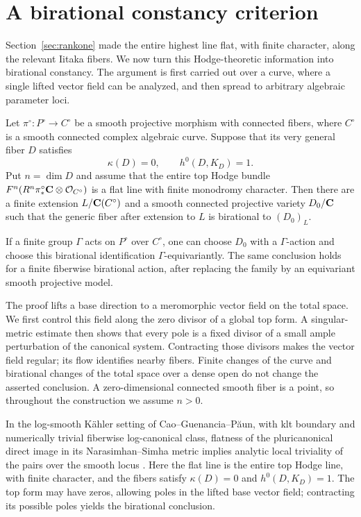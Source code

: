 \section{A birational constancy criterion}
\label{cc:section}

Section~\ref{sec:rankone} made the entire highest line flat, with
finite character, along the relevant Iitaka fibers. We now turn this
Hodge-theoretic information into birational constancy. The argument is
first carried out over a curve, where a single lifted vector field can
be analyzed, and then spread to arbitrary algebraic parameter loci.

\begin{theorem}
\label{cc:criterion}
Let $\pi^\circ:P^\circ\to C^\circ$ be a smooth projective morphism with
connected fibers, where $C^\circ$ is a smooth connected complex algebraic
curve.  Suppose that its very general fiber $D$ satisfies
\[
                 \kappa(D)=0,\qquad h^0(D,K_D)=1.
\]
Put $n=\dim D$ and assume that the entire top Hodge bundle
$F^n(R^n\pi^\circ_*\mathbf C\otimes\mathcal O_{C^\circ})$ is a flat line with
finite monodromy character.  Then there are a finite
extension $L/\mathbf C(C^\circ)$ and a smooth connected projective variety
$D_0/\mathbf C$ such that the generic fiber after extension to $L$ is birational
to $(D_0)_L$.

If a finite group $\Gamma$ acts on $P^\circ$ over $C^\circ$, one can choose
$D_0$ with a $\Gamma$-action and choose this birational identification
$\Gamma$-equivariantly.  The same conclusion holds for a finite
fiberwise birational action, after replacing the family by an
equivariant smooth projective model.
\end{theorem}

The proof lifts a base direction to a meromorphic vector field on the
total space.  We first control this field along the zero divisor of a
global top form.  A singular-metric estimate then shows that every pole
is a fixed divisor of a small ample perturbation of the canonical
system.  Contracting those divisors makes the vector field regular;
its flow identifies nearby fibers.  Finite changes of the curve and
birational changes of the total space over a dense open do not change
the asserted conclusion.  A zero-dimensional connected smooth fiber is
a point, so throughout the construction we assume $n>0$.

In the log-smooth K\"ahler setting of Cao--Guenancia--P\u aun,
with klt boundary and numerically trivial fiberwise log-canonical
class, flatness of the pluricanonical direct image in its
Narasimhan--Simha metric implies analytic local triviality of the
pairs over the smooth locus
\cite[\S1.1, Theorem~1.2]{CaoGuenanciaPaun23}.
Here the flat line is the entire top Hodge line, with finite
character, and the fibers satisfy $\kappa(D)=0$ and $h^0(D,K_D)=1$.
The top form may have zeros, allowing poles in the lifted base
vector field; contracting its possible poles yields the birational
conclusion.

